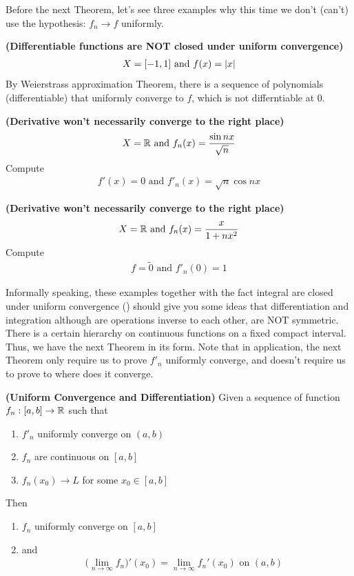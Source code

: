 \documentclass{report}
\begin{document}
\begin{mdframed}
Before the next Theorem, let's see three examples why this time we don't (can't) use the hypothesis: $f_n \to f$ uniformly. 
\begin{Example}{\textbf{(Differentiable functions are NOT closed under uniform convergence)}}{}
\begin{align*}
X=[-1,1]\text{ and }f(x)=\left|x\right|
\end{align*}
By Weierstrass approximation Theorem, there is a sequence of polynomials (differentiable) that uniformly converge to $f$, which is not differntiable at  $0$. 
\end{Example}
\begin{Example}{\textbf{(Derivative won't necessarily converge to the right place)}}{}
\begin{align*}
X=\mathbb{R} \text{ and }f_n(x)=\frac{\sin nx}{\sqrt{n} }
\end{align*}
Compute 
\begin{align*}
f'(x)=0 \text{ and }f'_n(x)=\sqrt{n} \cos nx
\end{align*}
\end{Example}
\begin{Example}{\textbf{(Derivative won't necessarily converge to the right place)}}{}
\begin{align*}
X=\mathbb{R} \text{ and }f_n(x)=\frac{x}{1+nx^2}
\end{align*}
Compute 
\begin{align*}
f=\tilde{0} \text{ and }f'_n(0)=1
\end{align*}
\end{Example}
Informally speaking, these examples together with the fact integral are closed under uniform convergence () should give you some ideas that differentiation and integration although are operations inverse to each other, are NOT symmetric. There is a certain hierarchy on continuous functions on a fixed compact interval. Thus, we have the next Theorem in its form. Note that in application, the next Theorem only require us to prove $f'_n$ uniformly converge, and doesn't require us to prove to where does it converge. 
\end{mdframed}
\begin{theorem}
\label{UCaD}
\textbf{(Uniform Convergence and Differentiation)} Given a sequence of function $f_n:[a,b]\rightarrow \mathbb{R}$ such that 
\begin{enumerate}[label=(\alph*)]
  \item $f'_n$ uniformly converge on  $(a,b)$
  \item $f_n$ are continuous on  $[a,b]$
  \item $f_n(x_0)\to L$ for some $x_0 \in [a,b]$
\end{enumerate}
Then 
\begin{enumerate}[label=(\alph*)]
  \item $f_n$ uniformly converge on  $[a,b]$ 
  \item and
\begin{align*}
\Big(\lim_{n\to \infty}f_n \Big)'(x_0)=\lim_{n\to \infty}f_n'(x_0)\text{ on $(a,b)$ }
\end{align*}
\end{enumerate}
\end{theorem}
\end{document}
